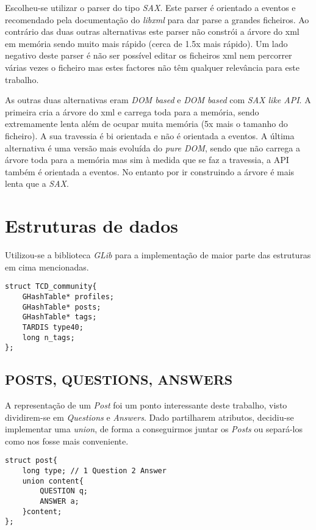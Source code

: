 \documentclass[letterpaper, 10 pt, conference]{IEEEtran}  %
\begin{document}
Escolheu-se utilizar o parser do tipo \textit{SAX}. Este parser é orientado a eventos e recomendado pela documentação do \textit{libxml} para dar parse a grandes ficheiros. Ao contrário das duas outras alternativas este parser não constrói a árvore do xml em memória sendo muito mais rápido (cerca de 1.5x mais rápido). Um lado negativo deste parser é não ser possível editar os ficheiros xml nem percorrer várias vezes o ficheiro mas estes factores não têm qualquer relevância para este trabalho.

As outras duas alternativas eram \textit{DOM based} e \textit{DOM based} com \textit{SAX like API}.
A primeira cria a árvore do xml e carrega toda para a memória, sendo extremamente lenta além de ocupar muita memória (5x mais o tamanho do ficheiro). A sua travessia é bi orientada e não é orientada a eventos.
A última alternativa é uma versão mais evoluída do \textit{pure DOM}, sendo que não carrega a árvore toda para a memória mas sim à medida que se faz a travessia, a API também é orientada a eventos. No entanto por ir construindo a árvore é mais lenta que a \textit{SAX}.

\section{Estruturas de dados}

Utilizou-se a biblioteca \textit{GLib} para a implementação de maior parte das estruturas em cima mencionadas.
\begin{lstlisting}
struct TCD_community{
    GHashTable* profiles;
    GHashTable* posts;
    GHashTable* tags;
    TARDIS type40;
    long n_tags;
};
\end{lstlisting}

\subsection{POSTS, QUESTIONS, ANSWERS}

A representação de um \textit{Post} foi um ponto interessante deste trabalho, visto dividirem-se em \textit{Questions} e \textit{Answers}. Dado partilharem atributos, decidiu-se implementar uma \textit{union}, de forma a conseguirmos juntar os \textit{Posts} ou separá-los como nos fosse mais conveniente.
\begin{lstlisting}
struct post{
    long type; // 1 Question 2 Answer
    union content{
        QUESTION q;
        ANSWER a;
    }content;
};
\end{lstlisting}
\end{document}
